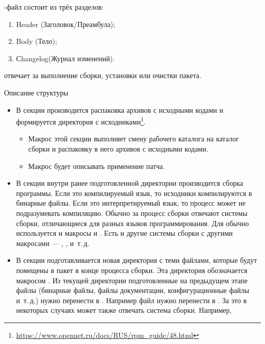 -файл состоит из трёх разделов:
\begin{enumerate}
	\item Header (Заголовок/Преамбула);
	\item Body (Тело);
	\item Сhangelog(Журнал изменений).
\end{enumerate}

 отвечает за выполнение сборки, установки или очистки пакета.

Описание структуры%
\begin{itemize}
	\item В секции  производится распаковка архивов с исходными кодами и 
		формируется директория с исходниками\footnote{\href{https://www.opennet.ru/docs/RUS/rpm_guide/48.html}{https://www.opennet.ru/docs/RUS/rpm\_guide/48.html}}. 
	\begin{itemize}
		\item Макрос  этой секции выполняет смену рабочего 
			каталога на каталог сборки и распаковку в него архивов с исходными кодами.
		\item Макрос  будет описывать применение патча.
	\end{itemize}
	\item В секции  внутри ранее подготовленной директории производится 
		сборка программы. Если это компилируемый язык, то исходники компилируются в бинарные 
		файлы. Если это интерпретируемый язык, то процесс может не подразумевать компиляцию. 
		Обычно за процесс сборки отвечают системы сборки, отличающиеся для разных языков 
		программирования. Для  обычно используется  и макросы 
		 и . Есть и другие системы сборки с другими 
		макросами --- , ,  и~т.\,д.
	\item В секции  подготавливается новая директория с теми файлами, которые будут 
		помещены в  пакет в конце процесса сборки. Эта директория обозначается макросом 
		. Из текущей директории подготовленные на предыдущем этапе файлы (бинарные 
		файлы, файлы документации, конфигурационные файлы и~т.\,д.) нужно перенести в . 
		Например файл  нужно перенести в . 
		За это в некоторых случаях может также отвечать система сборки. Например,  

\end{itemize}
